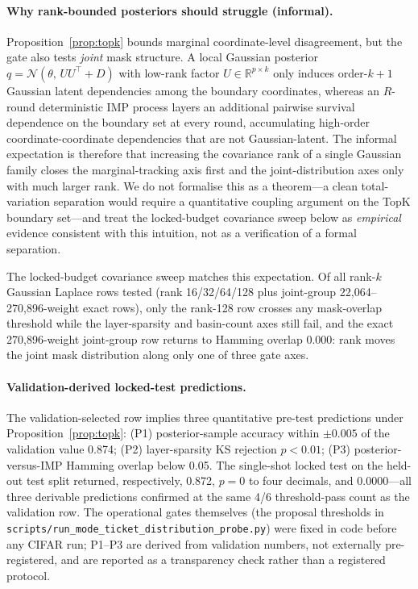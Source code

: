 \documentclass{article}
\begin{document}
\paragraph{Why rank-bounded posteriors should struggle (informal).}\label{prop:rankcov}
Proposition~\ref{prop:topk} bounds marginal coordinate-level disagreement,
but the gate also tests \emph{joint} mask structure. A local Gaussian
posterior $q = \mathcal{N}(\theta,\, U U^\top + D)$ with low-rank factor
$U \in \mathbb{R}^{p\times k}$ only induces order-$k+1$ Gaussian latent
dependencies among the boundary coordinates, whereas an $R$-round
deterministic IMP process layers an additional pairwise survival dependence
on the boundary set at every round, accumulating high-order
coordinate-coordinate dependencies that are not Gaussian-latent. The
informal expectation is therefore that increasing the covariance rank of a
single Gaussian family closes the marginal-tracking axis first and the
joint-distribution axes only with much larger rank. We do not formalise
this as a theorem---a clean total-variation separation would require a
quantitative coupling argument on the TopK boundary set---and treat the
locked-budget covariance sweep below as \emph{empirical} evidence
consistent with this intuition, not as a verification of a formal
separation.

The locked-budget covariance sweep matches this expectation. Of all
rank-$k$ Gaussian Laplace rows tested (rank 16/32/64/128 plus joint-group
22{,}064--270{,}896-weight exact rows), only the rank-128 row crosses any
mask-overlap threshold while the layer-sparsity and basin-count axes still
fail, and the exact 270{,}896-weight joint-group row returns to Hamming
overlap 0.000: rank moves the joint mask distribution along only one of
three gate axes.

\paragraph{Validation-derived locked-test predictions.}
The validation-selected row implies three quantitative pre-test predictions
under Proposition~\ref{prop:topk}: (P1) posterior-sample accuracy within
$\pm 0.005$ of the validation value 0.874; (P2) layer-sparsity KS rejection
$p < 0.01$; (P3) posterior-versus-IMP Hamming overlap below 0.05. The
single-shot locked test on the held-out test split returned, respectively,
0.872, $p = 0$ to four decimals, and 0.0000---all three derivable predictions
confirmed at the same 4/6 threshold-pass count as the validation row. The
operational gates themselves (the proposal thresholds in
\texttt{scripts/run\_mode\_ticket\_distribution\_probe.py}) were fixed in
code before any CIFAR run; P1--P3 are derived from validation numbers, not
externally pre-registered, and are reported as a transparency check rather
than a registered protocol.
\end{document}
